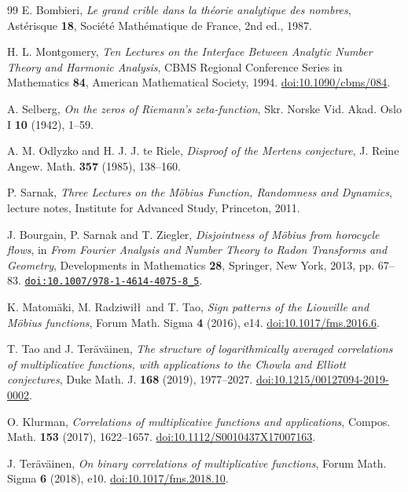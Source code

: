 \documentclass[11pt]{amsart}
\theoremstyle{definition}
\theoremstyle{remark}
\numberwithin{equation}{section}
\begin{document}
\begin{thebibliography}{99}
E. Bombieri, \emph{Le grand crible dans la th\'eorie analytique des nombres},
Ast\'erisque \textbf{18}, Soci\'et\'e Math\'ematique de France,
2nd ed., 1987.

H. L. Montgomery, \emph{Ten Lectures on the Interface Between Analytic
Number Theory and Harmonic Analysis},
CBMS Regional Conference Series in Mathematics \textbf{84},
American Mathematical Society, 1994.
\href{https://doi.org/10.1090/cbms/084}{doi:10.1090/cbms/084}.

A. Selberg, \emph{On the zeros of Riemann's zeta-function},
Skr. Norske Vid. Akad. Oslo I \textbf{10} (1942), 1--59.

A. M. Odlyzko and H. J. J. te Riele,
\emph{Disproof of the Mertens conjecture},
J. Reine Angew. Math. \textbf{357} (1985), 138--160.

P. Sarnak, \emph{Three Lectures on the M\"obius Function, Randomness
and Dynamics}, lecture notes, Institute for Advanced Study, Princeton, 2011.

J. Bourgain, P. Sarnak and T. Ziegler, \emph{Disjointness of M\"obius
from horocycle flows}, in \emph{From Fourier Analysis and Number Theory
to Radon Transforms and Geometry}, Developments in Mathematics
\textbf{28}, Springer, New York, 2013, pp. 67--83.
\href{https://doi.org/10.1007/978-1-4614-4075-8_5}{\nolinkurl{doi:10.1007/978-1-4614-4075-8_5}}.

K. Matom\"aki, M. Radziwi\l\l\ and T. Tao,
\emph{Sign patterns of the Liouville and M\"obius functions},
Forum Math. Sigma \textbf{4} (2016), e14.
\href{https://doi.org/10.1017/fms.2016.6}{doi:10.1017/fms.2016.6}.

T. Tao and J. Ter\"av\"ainen, \emph{The structure of logarithmically
averaged correlations of multiplicative functions, with applications
to the Chowla and Elliott conjectures},
Duke Math. J. \textbf{168} (2019), 1977--2027.
\href{https://doi.org/10.1215/00127094-2019-0002}{doi:10.1215/00127094-2019-0002}.

O. Klurman, \emph{Correlations of multiplicative functions and
applications}, Compos. Math. \textbf{153} (2017), 1622--1657.
\href{https://doi.org/10.1112/S0010437X17007163}{doi:10.1112/S0010437X17007163}.

J. Ter\"av\"ainen, \emph{On binary correlations of multiplicative functions},
Forum Math. Sigma \textbf{6} (2018), e10.
\href{https://doi.org/10.1017/fms.2018.10}{doi:10.1017/fms.2018.10}.


\end{thebibliography}
\end{document}
